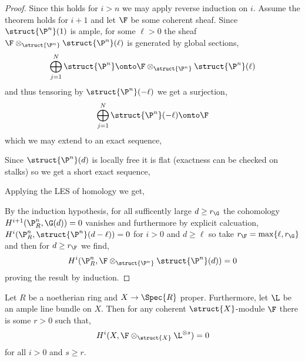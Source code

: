 \documentclass[12pt]{article}
\begin{document}
\begin{proof}
Since this holds for $i > n$ we may apply reverse induction on $i$. Assume the theorem holds for $i + 1$ and let $\F$ be some coherent sheaf. Since $\struct{\P^n}(1)$ is ample, for some $\ell > 0$ the sheaf $\F \otimes_{\struct{\P^n}} \struct{\P^n}(\ell)$ is generated by global sections,
\[ \bigoplus_{j = 1}^N \struct{\P^n} \onto \F \otimes_{\struct{\P^n}} \struct{\P^n}(\ell) \]
and thus tensoring by $\struct{\P^n}(-\ell)$ we get a surjection,
\[ \bigoplus_{j = 1}^N \struct{\P^n}(-\ell) \onto \F \]
which we may extend to an exact sequence,
\begin{center}
\end{center}
Since $\struct{\P^n}(d)$ is locally free it is flat (exactness can be checked on stalks) so we get a short exact sequence,
\begin{center}
\end{center}
Applying the LES of homology we get,
\begin{center}
\end{center}
By the induction hypothesis, for all sufficently large $d \ge r_\G$ the cohomology $H^{i+1}(\P^n_R, \G(d)) = 0$ vanishes and furthermore by explicit calcuation, $H^i(\P^n_R, \struct{\P^n}(d - \ell)) = 0$ for $i > 0$ and $d \ge \ell$ so take $r_\F = \max\{ \ell, r_\G \}$ and then for $d \ge r_\F$ we find,
\[ H^i(\P^n_R, \F \otimes_{\struct{\P^n}} \struct{\P^n}(d)) = 0 \]
proving the result by induction. 
\end{proof}

\begin{theorem}
Let $R$ be a noetherian ring and $X \to \Spec{R}$ proper. Furthermore, let $\L$ be an ample line bundle on $X$. Then for any coherent $\struct{X}$-module $\F$ there is some $r > 0$ such that,
\[ H^i(X, \F \otimes_{\struct{X}} \L^{\otimes s}) = 0 \]
for all $i > 0$ and $s \ge r$.
\end{theorem}
\end{document}
